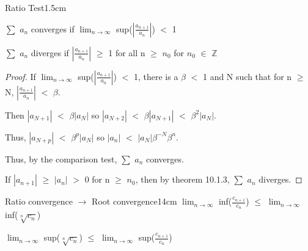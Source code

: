     \vspace{0.5cm}



    \begin{ltheorem}{Ratio Test}{1.5cm}
        \item $\sum$ $a_n$ converges if $\lim_{n \rightarrow \infty}$
            sup($|\frac{a_{n+1}}{a_n}|$) $<$ 1
        
        \item $\sum$ $a_n$ diverges if $|\frac{a_{n+1}}{a_n}|$ $\geq$ 1
            for all n $\geq$ $n_0$ for $n_0$ $\in$ $\mathbb{Z}$
    \end{ltheorem}

    \begin{proof}
        If $\lim_{n \rightarrow \infty}$ sup($|\frac{a_{n+1}}{a_n}|$) $<$ 1,
        there is a $\beta$ $<$ 1 and N such that for n $\geq$ N,
        $|\frac{a_{n+1}}{a_n}|$ $<$ $\beta$.

        Then $|a_{N+1}|$ $<$ $\beta |a_N|$ so
        $|a_{N+2}|$ $<$ $\beta$$|a_{N+1}|$ $<$ $\beta^2 |a_N|$.
        
        Thus, $|a_{N+p}|$ $<$ $\beta^p$$|a_N|$ so
        $|a_n|$ $<$ $|a_N| \beta^{-N} \beta^n$.

        Thus, by the {\color{red} comparison test}, $\sum$ $a_n$ converges.

        If $|a_{n+1}|$ $\geq$ $|a_n|$ $>$ 0 for n $\geq$ $n_0$, then by
        {\color{red} theorem 10.1.3}, $\sum$ $a_n$ diverges.
    \end{proof}

    \vspace{0.5cm}



    \begin{wtheorem}{Ratio convergence $\rightarrow$ Root convergence}{14cm}
        $\lim_{n \rightarrow \infty}$ inf($\frac{c_{n+1}}{c_n}$)
        $\leq$ $\lim_{n \rightarrow \infty}$ inf($\sqrt[n]{c_n}$)

        $\lim_{n \rightarrow \infty}$ sup($\sqrt[n]{c_n}$)
        $\leq$ $\lim_{n \rightarrow \infty}$ sup($\frac{c_{n+1}}{c_n}$)        
    \end{wtheorem}

